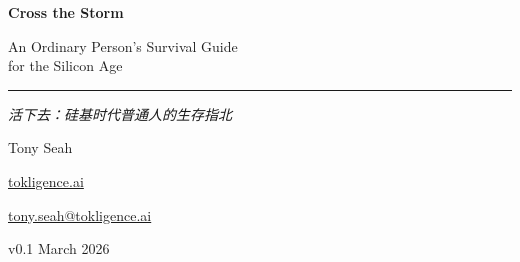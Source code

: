 \documentclass[a4paper,12pt]{article}
\begin{document}
\begin{titlepage}
\centering
\vspace*{4cm}
{\Huge\bfseries\sffamily\color{sectioncolor} Cross the Storm\par}
\vspace{0.8cm}
{\Large\color{subsectioncolor} An Ordinary Person's Survival Guide\\for the Silicon Age\par}
\vspace{0.5cm}
{\color{rulecolor}\rule{0.5\textwidth}{1pt}\par}
\vspace{0.5cm}
{\large\color{gray}\textit{活下去：硅基时代普通人的生存指北}\par}
\vspace{3cm}
{\Large Tony Seah\par}
\vspace{0.5cm}
{\normalsize\color{HTML2196F3}\href{https://tokligence.ai}{tokligence.ai}\par}
\vspace{0.3cm}
{\normalsize\href{mailto:tony.seah@tokligence.ai}{tony.seah@tokligence.ai}\par}
\vspace{3cm}
{\large\color{gray} v0.1 \quad March 2026\par}
\vfill
\end{titlepage}

\tableofcontents
\newpage


\end{document}
